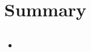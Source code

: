 \documentclass{scrartcl}
\begin{document}



\section{Summary}
\subsection{}
\begin{itemize}
\item
\end{itemize}








%




\end{document}
